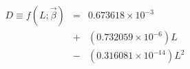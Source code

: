 

\begin{eqnarray*}
D \equiv f(L;\vec{\beta}) & = & 0.673618\times10^{-3}  \\
                          & + & (0.732059\times10^{-6})L  \\
                          & - & (0.316081\times10^{-14})L^2
\end{eqnarray*}


